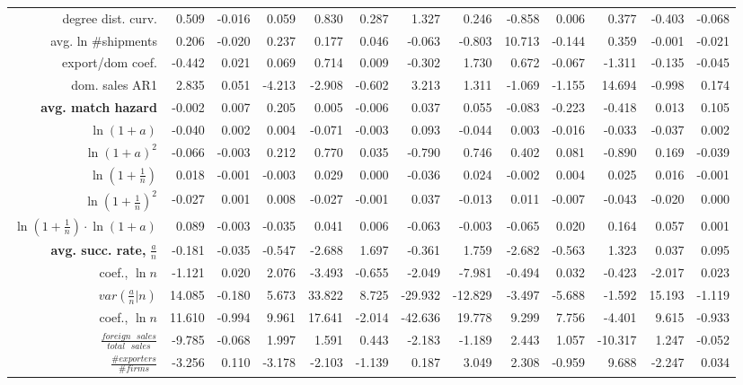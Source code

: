 \documentclass[12pt]{article}
\begin{document}
\begin{table}[tbp]
{\begin{tabular}{rrrrrrrrrrrrr}
degree dist. curv. & 0.509 & -0.016 & 0.059 & 0.830 & 0.287 & 1.327 & 0.246
& -0.858 & 0.006 & 0.377 & -0.403 & -0.068 \\ 
avg. ln \#shipments & 0.206 & -0.020 & 0.237 & 0.177 & 0.046 & -0.063 & 
-0.803 & 10.713 & -0.144 & 0.359 & -0.001 & -0.021 \\ 
export/dom coef. & -0.442 & 0.021 & 0.069 & 0.714 & 0.009 & -0.302 & 1.730 & 
0.672 & -0.067 & -1.311 & -0.135 & -0.045 \\ 
dom. sales AR1 & 2.835 & 0.051 & -4.213 & -2.908 & -0.602 & 3.213 & 1.311 & 
-1.069 & -1.155 & 14.694 & -0.998 & 0.174 \\ 
\textbf{avg. match hazard} & -0.002 & 0.007 & 0.205 & 0.005 & -0.006 & 0.037
& 0.055 & -0.083 & -0.223 & -0.418 & 0.013 & 0.105 \\ 
$\ln (1+a)$ & -0.040 & 0.002 & 0.004 & -0.071 & -0.003 & 0.093 & -0.044 & 
0.003 & -0.016 & -0.033 & -0.037 & 0.002 \\ 
$\ln (1+a)^{2}$ & -0.066 & -0.003 & 0.212 & 0.770 & 0.035 & -0.790 & 0.746 & 
0.402 & 0.081 & -0.890 & 0.169 & -0.039 \\ 
$\ln (1+\frac{1}{n})$ & 0.018 & -0.001 & -0.003 & 0.029 & 0.000 & -0.036 & 
0.024 & -0.002 & 0.004 & 0.025 & 0.016 & -0.001 \\ 
$\ln (1+\frac{1}{n})^{2}$ & -0.027 & 0.001 & 0.008 & -0.027 & -0.001 & 0.037
& -0.013 & 0.011 & -0.007 & -0.043 & -0.020 & 0.000 \\ 
$\ln (1+\frac{1}{n})\cdot \ln (1+a)$ & 0.089 & -0.003 & -0.035 & 0.041 & 
0.006 & -0.063 & -0.003 & -0.065 & 0.020 & 0.164 & 0.057 & 0.001 \\ 
\textbf{avg. succ. rate, }$\frac{a}{n}$ & -0.181 & -0.035 & -0.547 & -2.688
& 1.697 & -0.361 & 1.759 & -2.682 & -0.563 & 1.323 & 0.037 & 0.095 \\ 
coef., $\ln n$ & -1.121 & 0.020 & 2.076 & -3.493 & -0.655 & -2.049 & -7.981
& -0.494 & 0.032 & -0.423 & -2.017 & 0.023 \\ 
$var(\frac{a}{n}|n)$ & 14.085 & -0.180 & 5.673 & 33.822 & 8.725 & -29.932 & 
-12.829 & -3.497 & -5.688 & -1.592 & 15.193 & -1.119 \\ 
coef., $\ln n$ & 11.610 & -0.994 & 9.961 & 17.641 & -2.014 & -42.636 & 19.778
& 9.299 & 7.756 & -4.401 & 9.615 & -0.933 \\ 
$\frac{foreign\text{ }sales}{total\text{ }sales}$ & -9.785 & -0.068 & 1.997
& 1.591 & 0.443 & -2.183 & -1.189 & 2.443 & 1.057 & -10.317 & 1.247 & -0.052
\\ 
$\frac{\#exporters}{\#firms}$ & -3.256 & 0.110 & -3.178 & -2.103 & -1.139 & 
0.187 & 3.049 & 2.308 & -0.959 & 9.688 & -2.247 & 0.034\end{tabular}}
\end{table}
\end{document}
